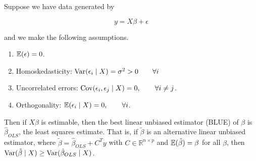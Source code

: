 \begin{theorem}

Suppose we have data generated by

\[
y = X \beta + \epsilon
\]

and we make the following assumptions.

\begin{enumerate}

\item \(\E(\epsilon) = 0\).

\item Homoskedasticity: \(\Var(\epsilon_i \mid X) = \sigma^2 > 0 \qquad \forall i\)

\item Uncorrelated errors: \(\Cov(\epsilon_i, \epsilon_j \mid X) = 0, \qquad \forall i \neq j\).

\item Orthogonality: \(\E(\epsilon_i \mid X) = 0, \qquad \forall i\).

\end{enumerate}

Then if \(X \beta\) is estimable, then the best linear unbiased estimator (BLUE) of \(\beta\) is \(\hat{\beta}_{OLS}\), the least squares estimate. That is, if \(\tilde{\beta}\) is an alternative linear unbiased estimator, where \(\tilde{\beta} = \hat{\beta}_{OLS} + C^Ty\) with \(C \in \mathbb{R}^{n \times p}\) and \(\E(\tilde{\beta}) = \beta\) for all \(\beta\), then \(\Var (\tilde{\beta} \mid X ) \geq \Var( \hat{\beta}_{OLS} \mid X)\). 

\end{theorem}

